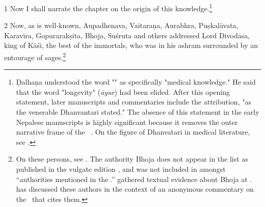 \begin{translation}
    
    \item[1] Now I shall narrate the chapter on the origin of this
    knowledge.\footnote{Ḍalhaṇa understood the word "" as
    specifically "medical knowledge." He said that the word "longevity"
    (\emph{āyur})  had been elided.
    After this opening statement, later manuscripts and commentaries include
    the attribution, "as the venerable Dhanvantari stated."  The absence of this
    statement in the early Nepalese manuscripts is highly significant because it 
    removes
    the outer narrative frame of the \SS\
    \parencites[148]{wuja-2013}[\S\,3.1.2]{kleb-2021b}{rai-2019}{birc-2021}.  On 
    the 
    figure of Dhanvatari in 
    medical literature, see \cite[IA 358--361]{meul-hist}.} %
    
    \item[2] Now, as is well-known, Aupadhenava, Vaitaraṇa, Aurabhra, Puṣkalāvata,
    Karavīra, Gopurarakṣita, Bhoja, Suśruta and others addressed Lord Divodāsa,
    king of Kāśi, the best of the immortals, who was in his ashram surrounded by
    an entourage of sages.\footnote{On these persons, see \cite[IA
    361--363, 369\,ff.]{meul-hist}. The authority Bhoja does not appear in the list as
    published in the vulgate edition \citep[1]{susr-trikamji2}, and was not
    included in \cite{meul-hist} amongst “authorities mentioned in the \SS.” 
    \citeauthor{meul-hist} gathered textual evidence about Bhoja at \cite[IA
    690--691]{meul-hist}. \citet{kleb-2021a} has discussed these authors in the
    context of an anonymous commentary on the \SS\ that cites them.}
    
    \nocite{emen-1969}
    
    

\end{translation}
